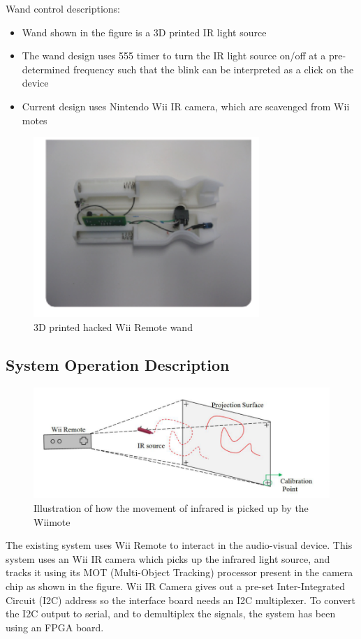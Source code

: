 \documentclass[12pt, a4paper]{article}
\begin{document}
\newpage

Wand control descriptions:
\begin{itemize}
\item Wand shown in the figure is a 3D printed IR light source
\item The wand design uses 555 timer to turn the IR light source on/off at a pre-determined frequency such that the blink can be interpreted as a click on the device
\item Current design uses Nintendo Wii IR camera, which are scavenged from Wii motes
\end{itemize}

\begin{figure}[htp]
\centering
\includegraphics[scale=0.4]{wand1.png}
\caption{3D printed hacked Wii Remote wand}
\label{}
\end{figure}

\subsection{System Operation Description}
\begin{figure}[htp]
\centering
\includegraphics[scale=0.35]{wiiiii.png}
\caption{Illustration of how the movement of infrared is picked up by the Wiimote}
\label{}
\end{figure}

The existing system uses Wii Remote to interact in the audio-visual device. This system uses an Wii IR camera which picks up the infrared light source, and tracks it using its MOT (Multi-Object Tracking) processor present in the camera chip as shown in the figure. Wii IR Camera gives out a pre-set Inter-Integrated Circuit (I2C) address so the interface board needs an I2C multiplexer. To convert the I2C output to serial, and to demultiplex the signals, the system has been using an FPGA board. 
\end{document}
